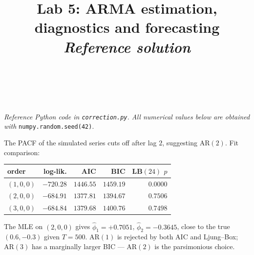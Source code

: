 \documentclass[a4paper,11pt]{article}
\title{Lab 5: ARMA estimation, diagnostics and forecasting\\
\large \emph{Reference solution}}
\author{\auteurNom\\\auteurEmail\\\auteurInstitution}
\date{\anneeUniversitaire}
\begin{document}
\maketitle

\noindent\emph{Reference Python code in \texttt{correction.py}.
All numerical values below are obtained with}
\texttt{numpy.random.seed(42)}.

\setcounter{excounter}{0}

\begin{exercise}\end{exercise}

\begin{solution}
The PACF of the simulated series cuts off after lag $2$, suggesting
AR$(2)$. Fit comparison:
\begin{center}
\begin{tabular}{lrrrr}
\toprule
order        & log-lik. & AIC      & BIC      & LB$(24)$ $p$ \\
\midrule
$(1,0,0)$    & $-720.28$ & $1446.55$ & $1459.19$ & $0.0000$ \\
$(2,0,0)$    & $-684.91$ & $\bm{1377.81}$ & $\bm{1394.67}$ & $0.7506$ \\
$(3,0,0)$    & $-684.84$ & $1379.68$ & $1400.76$ & $0.7498$ \\
\bottomrule
\end{tabular}
\end{center}
The MLE on $(2, 0, 0)$ gives
$\widehat\phi_1 = +0.7051$, $\widehat\phi_2 = -0.3645$, close to the
true $(0.6, -0.3)$ given $T = 500$. AR$(1)$ is rejected by both AIC
and Ljung--Box; AR$(3)$ has a marginally larger BIC --- AR$(2)$ is
the parsimonious choice.
\end{solution}

\begin{exercise}[MA$(1)$ identification]\end{exercise}
\end{document}
